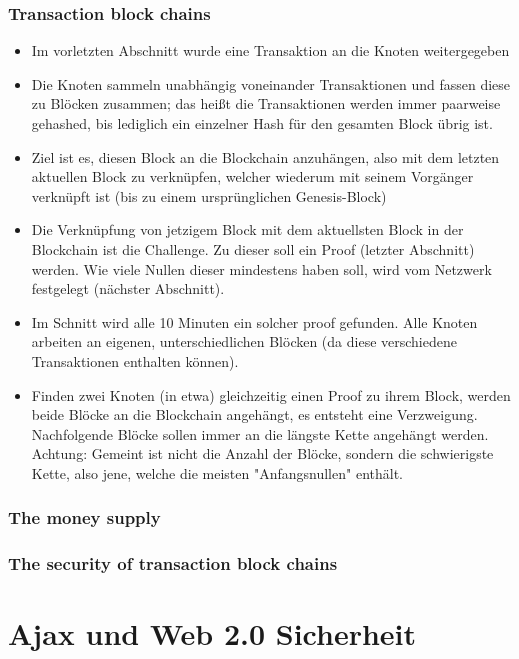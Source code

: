 \documentclass{article} %
\begin{document}
	\subsubsection{Transaction block chains}
	\begin{itemize}
		\item Im vorletzten Abschnitt wurde eine Transaktion an die Knoten weitergegeben
		\item Die Knoten sammeln unabhängig voneinander Transaktionen und fassen diese zu Blöcken zusammen; das heißt die Transaktionen werden immer paarweise gehashed, bis lediglich ein einzelner Hash für den gesamten Block übrig ist.
		\item Ziel ist es, diesen Block an die Blockchain anzuhängen, also mit dem letzten aktuellen Block zu verknüpfen, welcher wiederum mit seinem Vorgänger verknüpft ist (bis zu einem ursprünglichen Genesis-Block)
		\item Die Verknüpfung von jetzigem Block mit dem aktuellsten Block in der Blockchain ist die Challenge. 
		Zu dieser soll ein Proof (letzter Abschnitt) werden.
		Wie viele Nullen dieser mindestens haben soll, wird vom Netzwerk festgelegt (nächster Abschnitt).
		\item Im Schnitt wird alle 10 Minuten ein solcher proof gefunden.
		Alle Knoten arbeiten an eigenen, unterschiedlichen Blöcken (da diese verschiedene Transaktionen enthalten können).
		\item Finden zwei Knoten (in etwa) gleichzeitig einen Proof zu ihrem Block, werden beide Blöcke an die Blockchain angehängt, es entsteht eine Verzweigung.
		Nachfolgende Blöcke sollen immer an die längste Kette angehängt werden.
		Achtung: Gemeint ist nicht die Anzahl der Blöcke, sondern die schwierigste Kette, also jene, welche die meisten "Anfangsnullen" enthält.
	\end{itemize}
	\subsubsection{The money supply}
	\subsubsection{The security of transaction block chains}
	\section{Ajax und Web 2.0 Sicherheit}
\end{document}
